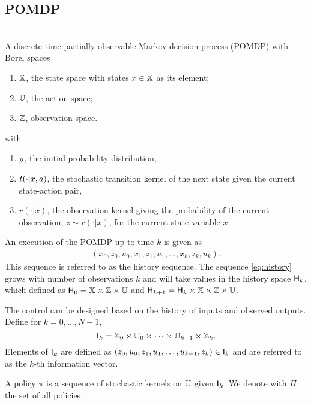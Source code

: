 \documentclass{ifacconf}
\begin{document}
 

\subsection{POMDP}\label{sec:POMDP}
\begin{definition} \label{def:MDP}\mbox{ }\\
A discrete-time partially observable Markov decision process (POMDP) with Borel spaces
\begin{enumerate}
	\item ${\mathbb{X}}$, the state space with states $x\in{\mathbb{X}}$ as its element;
	\item ${\mathbb{U}}$, the action space;
	\item ${\mathbb{Z}}$, observation space.
\end{enumerate}
with 
\begin{enumerate}
\item $\rho$, the initial probability distribution,
\item $t(\cdot|x,a)$, the stochastic transition kernel of the next state given the current state-action pair,
\item $r(\cdot|x)$,  the observation kernel giving the probability of the current observation,  $z\sim r(\cdot|x)$,  for the current state variable $x$.
\end{enumerate}


\end{definition} 

An execution of the POMDP  up to time $k$ is given as
\begin{align}\label{eq:history} (x_0,z_0,u_0,x_1,z_1,u_1,\ldots,x_k,z_k,u_k).\end{align}
This sequence is referred to as the history sequence.
The sequence  \eqref{eq:history} grows with number of observations  $k$ and will take values in the history space ${\mathsf{H}}_k$, which defined as
${\mathsf{H}}_0={\mathbb{X}}\times{\mathbb{Z}}\times {\mathbb{U}}$ and ${\mathsf{H}}_{k+1}={\mathsf{H}}_{k}\times{\mathbb{X}}\times{\mathbb{Z}}\times {\mathbb{U}}$.


The control can be designed based on the history of inputs and observed outputs.  
Define for $k=0,\ldots,N-1,$ 
\[{\mathsf{I}}_k={\mathbb{Z}}_0\times{\mathbb{U}}_0\times\dots\times{\mathbb{U}}_{k-1}\times{\mathbb{Z}}_k.\]
Elements of ${\mathsf{I}}_k$ are defined as $(z_0,u_0,z_1,u_1,\ldots,u_{k-1},z_k)\in{\mathsf{I}}_k$ and are referred to as the $k$-th information vector. 
 

 A policy $\pi$ is a sequence of stochastic kernels on ${\mathbb{U}}$ given ${\mathsf{I}}_k$. 
We denote with $\Pi$ the set of all policies.
\citep[Def. 10.4]{bertsekas2004stochastic}  
\end{document}
